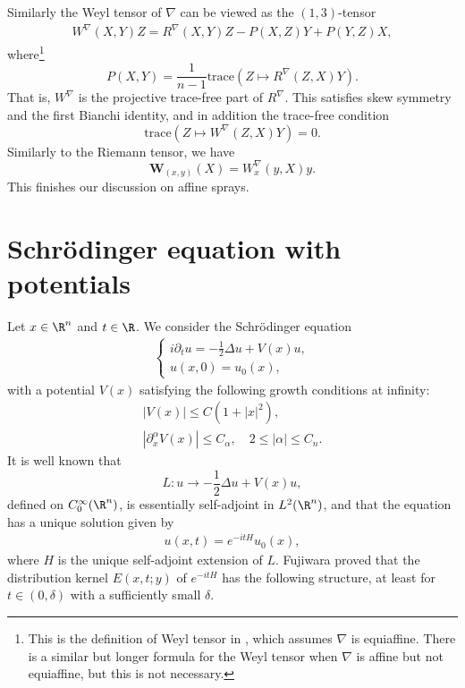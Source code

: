 \documentclass{article}
\numberwithin{equation}{section}
\theoremstyle{plain}
\begin{document}
Similarly the Weyl tensor of $\nabla$ can be viewed as the $(1,3)$-tensor 
\begin{align}\label{eq: affine weyl tensor formula}
    W^\nabla(X,Y)Z = R^\nabla(X,Y)Z - P(X,Z)Y + P(Y,Z)X, 
\end{align}
where\footnote{This is the definition of Weyl tensor in \cite[Page 17]{affDiffGeoKatsumi}, which assumes $\nabla$ is equiaffine. There is a similar but longer formula for the Weyl tensor when $\nabla$ is affine but not equiaffine, but this is not necessary.}
\begin{equation}
P(X,Y) = \frac{1}{n-1}\mathrm{trace}(Z \mapsto R^\nabla(Z,X)Y).
\end{equation}
That is, $W^\nabla$ is the projective trace-free part of $R^\nabla$. This satisfies skew symmetry and the first Bianchi identity, and in addition the trace-free condition
\begin{equation}
\mathrm{trace}(Z \mapsto W^\nabla(Z,X)Y) = 0.
\end{equation}
 Similarly to the Riemann tensor, we have \begin{equation}
 \mathbf W_{(x,y)}(X) = W_x^\nabla(y,X)y.
 \end{equation}
This finishes our discussion on affine sprays. 









	\section{Schr\"odinger equation with potentials}\label{260615append_c}
	

	
	
	Let $x\in\R^n$ and $t\in\R$. We consider the Schr\"odinger equation
	\begin{align}\label{Schro}
		\begin{cases}
			i \partial_t u = -\frac12 \Delta u +V(x)u,   \\
			u(x,0)= u_0(x),  
		\end{cases}
	\end{align}
	with a potential $V(x)$ satisfying the following growth conditions at infinity:
	\begin{align}
            |V(x)|\le C(1+|x|^2),\qquad \\
		|\partial_x^\alpha V(x)|\le C_\alpha,\quad 2\le |\alpha|\le C_n.
	\end{align}
	It is well known that
	\begin{equation}
	L: u\to -\frac12\Delta u+ V(x)u,
	\end{equation}
	 defined on $C_0^\infty(\R^n)$, is essentially self-adjoint in $L^2(\R^n)$, and that the equation has a unique solution given by 
    \begin{align}
        u(x,t)= e^{-itH}u_0(x),     
    \end{align}
    where $H$ is the unique self-adjoint extension of $L$. Fujiwara \cite[(14)]{F80} proved that the distribution kernel $E(x,t;y)$ of $e^{-itH}$ has the following structure, at least for $t\in (0,\delta)$ with a sufficiently small $\delta$. \\
    
\end{document}
